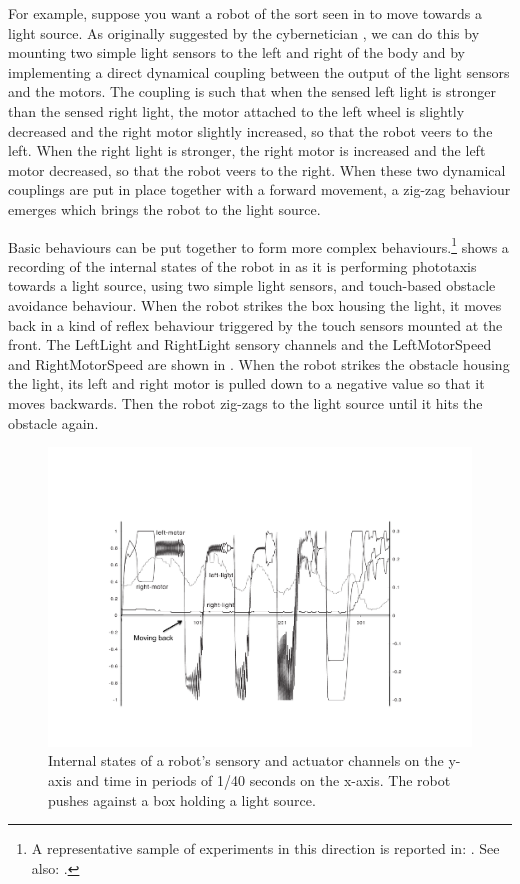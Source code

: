 For example, suppose you want a robot of the sort seen 
in  to move towards a light source. As originally 
suggested by the cybernetician \cite{Braitenberg:1984}, 
we can do this by mounting two simple light sensors 
to the left and right of the body and by implementing a 
direct dynamical coupling between the output of the light
sensors and the motors. The coupling is such that when
the sensed left light is stronger than the sensed right
light, the motor attached
to the left wheel is slightly decreased and the right
motor slightly increased, so that the robot veers to the left. 
When the right light is stronger, the right motor is 
increased and the left motor decreased, so that the 
robot veers to the right. When these two dynamical 
couplings are put in place together with a
forward movement, a zig-zag behaviour emerges which
brings the robot to the light source. 

Basic behaviours can be put together to form 
more complex behaviours.\footnote{A representative sample of experiments in this 
direction is reported in: \cite{Steels:1995}. See 
also: \cite{Arkin:1998}.}
shows a recording of the internal states of the robot
in  as it is performing 
phototaxis towards a light source, using two simple
light sensors, and touch-based obstacle avoidance
behaviour.  When the robot strikes the box housing 
the light, it moves back in a kind of reflex behaviour
triggered by the touch sensors mounted at the front. 
The LeftLight and 
RightLight sensory channels and the LeftMotorSpeed
and RightMotorSpeed are shown 
in . When the robot strikes
the obstacle housing the light, its left and right
motor is pulled down to a negative value so that 
it moves backwards. Then the robot zig-zags to the 
light source until it hits the obstacle again. 

\begin{figure}[htbp]
  \centerline{\includegraphics[width=\textwidth]{chap3/figs/phototaxis.pdf}}
\caption{\label{phototaxis}Internal states of a robot's sensory and actuator channels on 
the y-axis and time in periods of 1/40 seconds on the x-axis.
The robot pushes against a box holding a light source.}
\end{figure}

